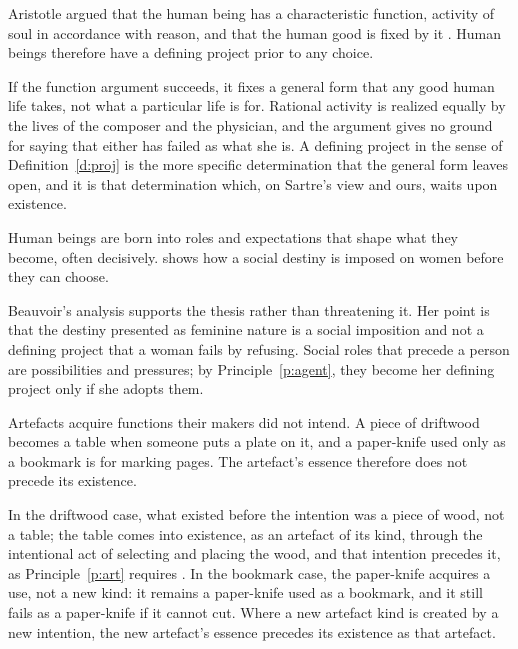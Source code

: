 \documentclass{situationist-preprint}
\begin{document}
\begin{objection}\label{o:arist}
Aristotle argued that the human being has a characteristic function, activity of soul in accordance with reason, and that the human good is fixed by it \citep[I.7]{AristotleNE}. Human beings therefore have a defining project prior to any choice.
\end{objection}

\begin{reply}
If the function argument succeeds, it fixes a general form that any good human life takes, not what a particular life is for. Rational activity is realized equally by the lives of the composer and the physician, and the argument gives no ground for saying that either has failed as what she is. A defining project in the sense of Definition~\ref{d:proj} is the more specific determination that the general form leaves open, and it is that determination which, on Sartre's view and ours, waits upon existence.
\end{reply}

\begin{objection}\label{o:soc}
Human beings are born into roles and expectations that shape what they become, often decisively. \citet{Beauvoir1949} shows how a social destiny is imposed on women before they can choose.
\end{objection}

\begin{reply}
Beauvoir's analysis supports the thesis rather than threatening it. Her point is that the destiny presented as feminine nature is a social imposition and not a defining project that a woman fails by refusing. Social roles that precede a person are possibilities and pressures; by Principle~\ref{p:agent}, they become her defining project only if she adopts them.
\end{reply}

\begin{objection}[Repurposing]\label{o:rep}
Artefacts acquire functions their makers did not intend. A piece of driftwood becomes a table when someone puts a plate on it, and a paper-knife used only as a bookmark is for marking pages. The artefact's essence therefore does not precede its existence.
\end{objection}

\begin{reply}
In the driftwood case, what existed before the intention was a piece of wood, not a table; the table comes into existence, as an artefact of its kind, through the intentional act of selecting and placing the wood, and that intention precedes it, as Principle~\ref{p:art} requires \citep{Hilpinen1992}. In the bookmark case, the paper-knife acquires a use, not a new kind: it remains a paper-knife used as a bookmark, and it still fails as a paper-knife if it cannot cut. Where a new artefact kind is created by a new intention, the new artefact's essence precedes its existence as that artefact.
\end{reply}
\end{document}
